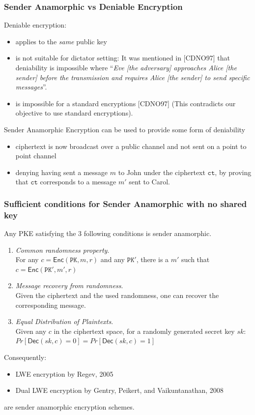 \documentclass[]{beamer}
\newcommand{\algofont}[1]{{\mathsf{#1}}}
\newcommand{\objfont}[1]{{\mathtt{#1}}}
\newcommand{\enc}{\algofont{Enc}}
\newcommand{\dec}{\algofont{Dec}}
\newcommand{\ct}{\objfont{ct}}      %
\newcommand{\pk}{\objfont{PK}}      %
\begin{document}
\begin{frame}
\frametitle{Sender Anamorphic vs Deniable Encryption}
Deniable encryption:
\begin{itemize}
\item  applies to the {\em same } public key
\item is not suitable for dictator setting: It was mentioned in [CDNO97] that deniability is impossible where
``{\color{brown}\em Eve [the adversary] approaches Alice [the sender] {\em before} the transmission and requires Alice [the sender]
to send specific messages}''. 
\item is impossible for a standard encryptions [CDNO97] (This contradicts our objective to use standard encryptions).
\end{itemize}
\pause
Sender Anamorphic Encryption can be used to provide some form of deniability
\begin{itemize}

        \item ciphertext is now broadcast over a public channel and not sent on a point to point channel
        \item denying having sent a message $m$ to John under the ciphertext $\ct$, by proving that $\ct$ corresponds to a message $m'$ sent to Carol. 
\end{itemize}

\end{frame}



\begin{frame}
\frametitle{Sufficient conditions for Sender Anamorphic with no shared key}
Any PKE satisfying the 3 following conditions is sender anamorphic. 
\begin{enumerate}
\item {\em \color{brown} Common randomness property}.\\
For any $ c= \enc({\pk},m,r)$ and any $\pk'$, there is a $m'$ such that $ c= \enc({\pk'},m',r)$ 
\item {\em\color{brown} Message recovery from randomness}.\\
Given the ciphertext and the used randomness, one can recover the corresponding message.  
\item {\em\color{brown} Equal Distribution of Plaintexts}.\\
Given any $c$ in the ciphertext space, for a randomly generated secret key $sk$: $Pr[\dec(sk,c)=0] = Pr[\dec(sk,c)=1]$
\end{enumerate}

\pause

Consequently: 
\begin{itemize}
    \item {\color{purple}LWE encryption} by Regev, 2005
    \item {\color{purple} Dual LWE encryption} by Gentry, Peikert, and Vaikuntanathan, 2008
\end{itemize}
are sender anamorphic encryption schemes. 
\end{frame}
\end{document}
